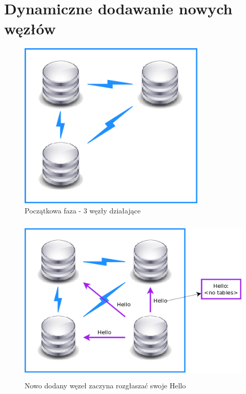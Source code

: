 \documentclass[a4paper, oneside, 11pt]{report}
\begin{document}
\chapter{Dynamiczne dodawanie nowych węzłów}
\begin{figure}[h]
\centering
\includegraphics[height=8cm]{restore_init.png}
\caption{Początkowa faza - 3 węzły działające}
\end{figure}

\begin{figure}[h]
\centering
\includegraphics[height=8cm]{restore_first_hello.png}
\caption{Nowo dodany węzeł zaczyna rozgłaszać swoje Hello}
\end{figure}
\end{document}
